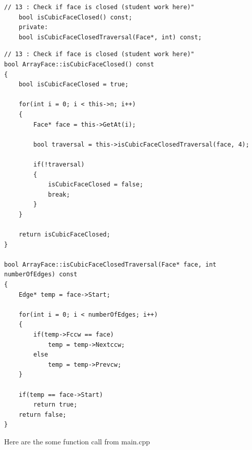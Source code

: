 \documentclass{article}
\begin{document}
\begin{lstlisting}[label=exercices-h-traversal,caption=Exercice.h]	
    // 13 : Check if face is closed (student work here)"
    bool isCubicFaceClosed() const;
    private:
    bool isCubicFaceClosedTraversal(Face*, int) const;
\end{lstlisting}

\begin{lstlisting}[label=exercices-cpp-traversal,caption=Exercice.cpp]	
// 13 : Check if face is closed (student work here)"
bool ArrayFace::isCubicFaceClosed() const
{
    bool isCubicFaceClosed = true;

    for(int i = 0; i < this->n; i++)
    {
        Face* face = this->GetAt(i);

        bool traversal = this->isCubicFaceClosedTraversal(face, 4);

        if(!traversal)
        {
            isCubicFaceClosed = false;
            break;
        }
    }

    return isCubicFaceClosed;
}

bool ArrayFace::isCubicFaceClosedTraversal(Face* face, int numberOfEdges) const
{
    Edge* temp = face->Start;

    for(int i = 0; i < numberOfEdges; i++)
    {
        if(temp->Fccw == face)
            temp = temp->Nextccw;
        else
            temp = temp->Prevcw;
    }

    if(temp == face->Start)
        return true;
    return false;
}
\end{lstlisting}

Here are the some function call from main.cpp
\end{document}

